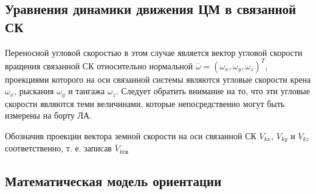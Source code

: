\subsection{Уравнения динамики движения ЦМ в связанной СК}
Переносной угловой скоростью в этом случае является вектор угловой скорости вращения связанной СК относительно нормальной $\overline{\omega} = (\omega_x, \omega_y, \omega_z)^T$, проекциями которого на оси связанной системы являются угловые скорости крена $\omega_x$, рыскания $\omega_y$ и тангажа $\omega_z$. Следует обратить внимание на то, что эти угловые скорости являются теми величинами, которые непосредственно могут быть измерены на борту ЛА.

Обозначив проекции вектора земной скорости на оси связанной СК $V_{kx}$, $V_{ky}$ и $V_{kz}$ соответственно, т. е. записав $\overline{V}_{k\text{св}}$
\clearpage

\subsection{Математическая модель ориентации}
\clearpage